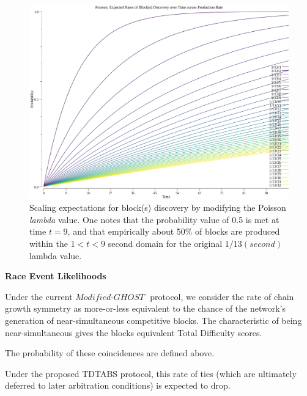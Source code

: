 \documentclass[11pt]{article}
\theoremstyle{plain}
\newcommand{\mghost}{\textit{Modified-GHOST }}
\begin{document}
{    \begin{figure}[tph]
        \centering
        \includegraphics[width=1.0\textwidth]{imgs/vis_poisson_lambda.png}
        \caption{
            Scaling expectations for block(s) discovery by modifying the Poisson \textit{lambda} value.
            One notes that the probability value of 0.5 is met at time $t=9$,
            and that empirically about 50\% of blocks are produced within the $1 < t < 9$ second domain
            for the original $1/13 (second)$ lambda value.
        }
        \label{fig:vis_poisson_lambda}
    \end{figure}




%
%
%
%
\clearpage
\textbf{Race Event Likelihoods}

Under the current $\mghost$ protocol, we consider the rate of chain growth symmetry as more-or-less
equivalent to the chance of the network's generation of near-simultaneous competitive blocks.
The characteristic of being near-simultaneous gives the blocks equivalent Total Difficulty scores.

The probability of these coincidences are defined above.

Under the proposed TDTABS protocol, this rate of ties
(which are ultimately deferred to later arbitration conditions)
is expected to drop.




}
\end{document}
